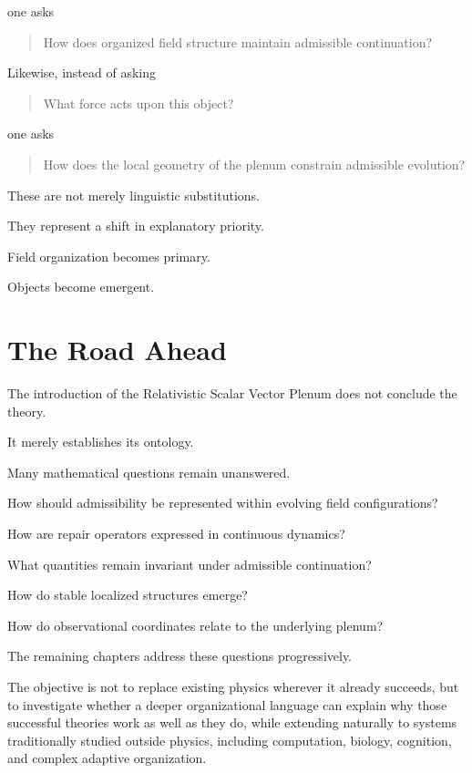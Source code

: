 \documentclass[11pt,oneside]{book}
\numberwithin{equation}{chapter}
\theoremstyle{definition}
\theoremstyle{plain}
\begin{document}
one asks

\begin{quote}
How does organized field structure maintain admissible continuation?
\end{quote}

Likewise, instead of asking

\begin{quote}
What force acts upon this object?
\end{quote}

one asks

\begin{quote}
How does the local geometry of the plenum constrain admissible evolution?
\end{quote}

These are not merely linguistic substitutions.

They represent a shift in explanatory priority.

Field organization becomes primary.

Objects become emergent.

\section{The Road Ahead}

The introduction of the Relativistic Scalar Vector Plenum does not conclude
the theory.

It merely establishes its ontology.

Many mathematical questions remain unanswered.

How should admissibility be represented within evolving field
configurations?

How are repair operators expressed in continuous dynamics?

What quantities remain invariant under admissible continuation?

How do stable localized structures emerge?

How do observational coordinates relate to the underlying plenum?

The remaining chapters address these questions progressively.

The objective is not to replace existing physics wherever it already
succeeds, but to investigate whether a deeper organizational language can
explain why those successful theories work as well as they do, while
extending naturally to systems traditionally studied outside physics,
including computation, biology, cognition, and complex adaptive
organization.
\end{document}
